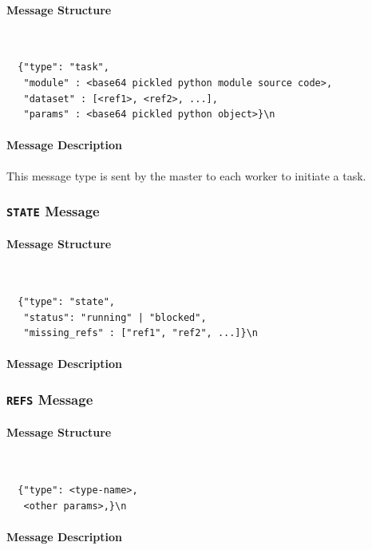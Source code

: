 \documentclass[%
  final,
  notitlepage,
  narroweqnarray,
  inline,
]{ieee}
\begin{document}
\paragraph{Message Structure}
{\tt \small
\begin{verbatim}
  {"type": "task",
   "module" : <base64 pickled python module source code>,
   "dataset" : [<ref1>, <ref2>, ...],
   "params" : <base64 pickled python object>}\n
\end{verbatim}}

\paragraph{Message Description}
This message type is sent by the master to each worker to initiate a task.



\subsubsection{\texttt{STATE} Message}

\paragraph{Message Structure}
{\tt \small
\begin{verbatim}
  {"type": "state",
   "status": "running" | "blocked",
   "missing_refs" : ["ref1", "ref2", ...]}\n
\end{verbatim}}

\paragraph{Message Description}


\subsubsection{\texttt{REFS} Message}

\paragraph{Message Structure}
{\tt \small
\begin{verbatim}
  {"type": <type-name>,
   <other params>,}\n
\end{verbatim}}

\paragraph{Message Description}
\end{document}
